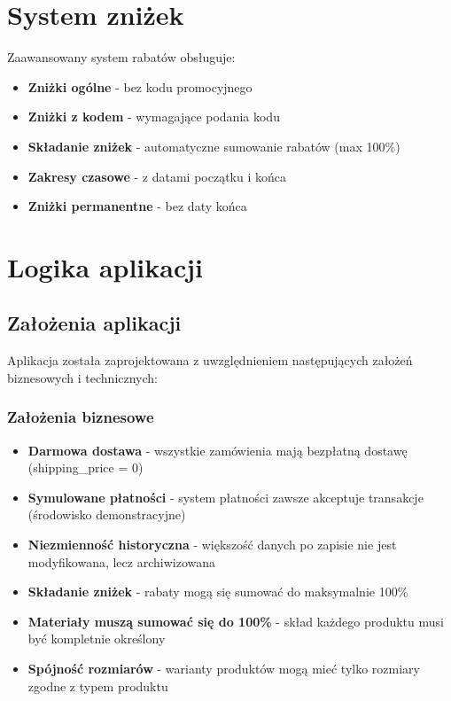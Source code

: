 \section*{System zniżek}

Zaawansowany system rabatów obsługuje:
\begin{itemize}
    \item \textbf{Zniżki ogólne} - bez kodu promocyjnego
    \item \textbf{Zniżki z kodem} - wymagające podania kodu
    \item \textbf{Składanie zniżek} - automatyczne sumowanie rabatów (max 100\%)
    \item \textbf{Zakresy czasowe} - z datami początku i końca
    \item \textbf{Zniżki permanentne} - bez daty końca
\end{itemize}

\section*{Logika aplikacji}

\subsection*{Założenia aplikacji}

Aplikacja została zaprojektowana z uwzględnieniem następujących założeń biznesowych i technicznych:

\subsubsection*{Założenia biznesowe}
\begin{itemize}
    \item \textbf{Darmowa dostawa} - wszystkie zamówienia mają bezpłatną dostawę (shipping\_price = 0)
    \item \textbf{Symulowane płatności} - system płatności zawsze akceptuje transakcje (środowisko demonstracyjne)
    \item \textbf{Niezmienność historyczna} - większość danych po zapisie nie jest modyfikowana, lecz archiwizowana
    \item \textbf{Składanie zniżek} - rabaty mogą się sumować do maksymalnie 100\%
    \item \textbf{Materiały muszą sumować się do 100\%} - skład każdego produktu musi być kompletnie określony
    \item \textbf{Spójność rozmiarów} - warianty produktów mogą mieć tylko rozmiary zgodne z typem produktu
\end{itemize}

